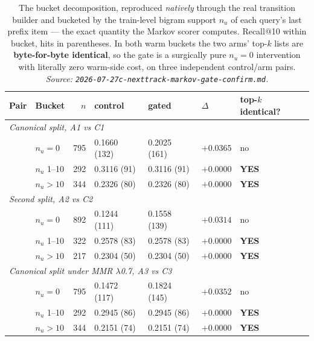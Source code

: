 \documentclass[11pt]{article}
\newcommand{\best}[1]{\textbf{#1}}
\begin{document}
\begin{table}[ht]
  \centering
  \caption{The bucket decomposition, reproduced \emph{natively} through the real
  transition builder and bucketed by the train-level bigram support $n_u$ of each
  query's last prefix item --- the exact quantity the Markov scorer computes.
  Recall@10 within bucket, hits in parentheses. In both warm buckets the two arms'
  top-$k$ lists are \textbf{byte-for-byte identical}, so the gate is a surgically
  pure $n_u=0$ intervention with literally zero warm-side cost, on three
  independent control/arm pairs.
  \emph{Source: \texttt{2026-07-27c-nexttrack-markov-gate-confirm.md}.}}
  \label{tab:markovgate-buckets}
  {\footnotesize\setlength{\tabcolsep}{5pt}\begin{tabular}{llrllll}
    \toprule
    Pair & Bucket & $n$ & control & gated & $\Delta$ & top-$k$ identical? \\
    \midrule
    \multicolumn{7}{l}{\emph{Canonical split, A1 vs C1}} \\
    & $n_u = 0$ & 795 & 0.1660 (132) & 0.2025 (161) & \best{$+0.0365$} & no \\
    & $n_u$ 1--10 & 292 & 0.3116 (91) & 0.3116 (91) & $+0.0000$ & \best{YES} \\
    & $n_u > 10$ & 344 & 0.2326 (80) & 0.2326 (80) & $+0.0000$ & \best{YES} \\
    \midrule
    \multicolumn{7}{l}{\emph{Second split, A2 vs C2}} \\
    & $n_u = 0$ & 892 & 0.1244 (111) & 0.1558 (139) & \best{$+0.0314$} & no \\
    & $n_u$ 1--10 & 322 & 0.2578 (83) & 0.2578 (83) & $+0.0000$ & \best{YES} \\
    & $n_u > 10$ & 217 & 0.2304 (50) & 0.2304 (50) & $+0.0000$ & \best{YES} \\
    \midrule
    \multicolumn{7}{l}{\emph{Canonical split under MMR $\lambda$0.7, A3 vs C3}} \\
    & $n_u = 0$ & 795 & 0.1472 (117) & 0.1824 (145) & \best{$+0.0352$} & no \\
    & $n_u$ 1--10 & 292 & 0.2945 (86) & 0.2945 (86) & $+0.0000$ & \best{YES} \\
    & $n_u > 10$ & 344 & 0.2151 (74) & 0.2151 (74) & $+0.0000$ & \best{YES} \\
    \bottomrule
  \end{tabular}}
\end{table}
\end{document}
